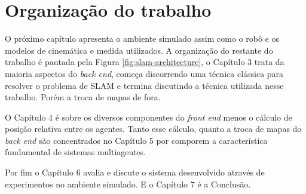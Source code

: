 \section{Organização do trabalho}
O próximo capítulo apresenta o ambiente simulado assim como o robô e os 
modelos de cinemática e medida utilizados. A organização do restante do 
trabalho é pautada pela Figura \ref{fig:slam-architecture}, o Capítulo 
3 trata da maioria aspectos do \textit{back end}, começa discorrendo uma técnica clássica para resolver o problema de SLAM e termina discutindo a técnica utilizada nesse trabalho. Porém a troca de mapas de fora. 

O Capítulo 4 é sobre os diversos componentes do \textit{front end} menos 
o cálculo de posição relativa entre os agentes. Tanto esse cálculo, 
quanto a troca de mapas do \textit{back end} são concentrados no 
Capítulo 5 por comporem a característica fundamental de 
sistemas multiagentes.

Por fim o Capítulo 6 avalia e discute o sistema desenvolvido através de 
experimentos no ambiente simulado. E o Capítulo 7 é a Conclusão.